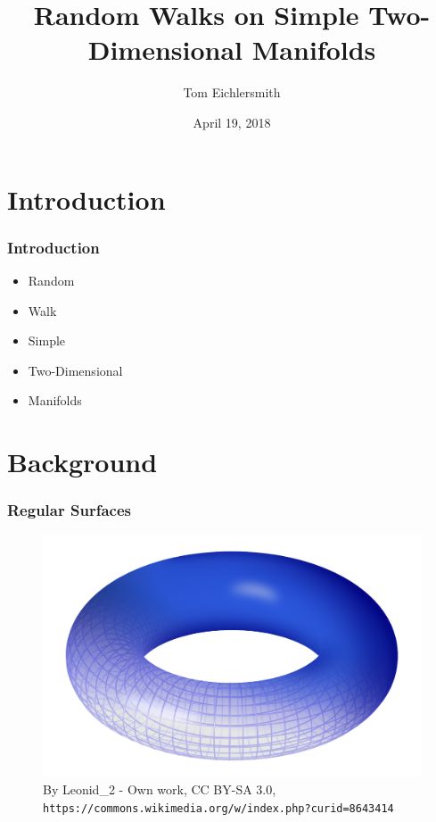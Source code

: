 \documentclass{beamer}
\title[Random Walks]{Random Walks on Simple Two-Dimensional Manifolds} %
\author{Tom Eichlersmith}
\institute[Hamline U]
{
Hamline University \\
\medskip
\texttt{teichlersmith01@hamline.edu}
}
\date{April 19, 2018}
\begin{document}
\begin{frame}
	\titlepage %
\end{frame}


\section{Introduction} 

\begin{frame}

	\frametitle{Introduction}
	
	\begin{itemize}
		\item Random
		\item Walk
		\item Simple
		\item Two-Dimensional
		\item Manifolds
	\end{itemize}

\end{frame}

\section{Background}

\begin{frame}
	
	\frametitle{}
	
\end{frame}

\begin{frame}

	\frametitle{Regular Surfaces}
	
	\begin{figure}
		\includegraphics[width=\textwidth]{images/Torus.png}
		\caption{By Leonid\_2 - Own work, CC BY-SA 3.0, \texttt{https://commons.wikimedia.org/w/index.php?curid=8643414}}
	\end{figure}
	
\end{frame}
\end{document}
